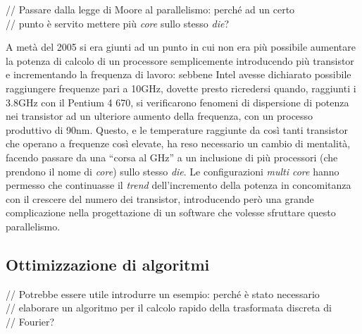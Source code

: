 // Passare dalla legge di Moore al parallelismo: perché ad un certo \\
// punto è servito mettere più \emph{core} sullo stesso \emph{die}?

A metà del 2005 si era giunti ad un punto in cui non era più possibile 
aumentare la potenza di calcolo di un processore semplicemente introducendo
più transistor e incrementando la frequenza di lavoro: sebbene Intel avesse 
dichiarato possibile raggiungere frequenze pari a 10GHz, dovette presto 
ricredersi quando, raggiunti i 3.8GHz con il Pentium 4 670, si verificarono 
fenomeni di dispersione di potenza nei transistor ad un ulteriore aumento della 
frequenza, con un processo produttivo di 90nm.
Questo, e le temperature raggiunte da così tanti transistor che operano a 
frequenze così elevate, ha reso necessario un cambio di mentalità, facendo 
passare da una ``corsa al GHz'' a un inclusione di più processori (che 
prendono il nome di \emph{core}) sullo stesso \emph{die}. 
Le configurazioni \emph{multi core} hanno permesso che continuasse il 
\emph{trend} dell'incremento della potenza in concomitanza con il crescere 
del numero dei transistor, introducendo però una grande complicazione nella 
progettazione di un software che volesse sfruttare questo parallelismo.

\subsection{Ottimizzazione di algoritmi}

// Potrebbe essere utile introdurre un esempio: perché è stato necessario \\
// elaborare un algoritmo per il calcolo rapido della trasformata discreta di \\
// Fourier?
